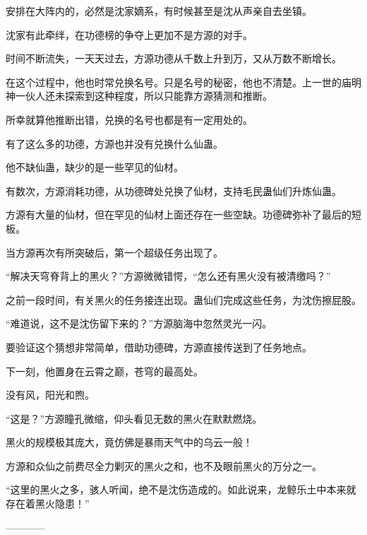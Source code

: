 \begin{this_body}
安排在大阵内的，必然是沈家嫡系，有时候甚至是沈从声亲自去坐镇。

沈家有此牵绊，在功德榜的争夺上更加不是方源的对手。

时间不断流失，一天天过去，方源功德从千数上升到万，又从万数不断增长。

在这个过程中，他也时常兑换名号。只是名号的秘密，他也不清楚。上一世的庙明神一伙人还未探索到这种程度，所以只能靠方源猜测和推断。

所幸就算他推断出错，兑换的名号也都是有一定用处的。

有了这么多的功德，方源也并没有兑换什么仙蛊。

他不缺仙蛊，缺少的是一些罕见的仙材。

有数次，方源消耗功德，从功德碑处兑换了仙材，支持毛民蛊仙们升炼仙蛊。

方源有大量的仙材，但在罕见的仙材上面还存在一些空缺。功德碑弥补了最后的短板。

当方源再次有所突破后，第一个超级任务出现了。

“解决天穹脊背上的黑火？”方源微微错愕，“怎么还有黑火没有被清缴吗？”

之前一段时间，有关黑火的任务接连出现。蛊仙们完成这些任务，为沈伤擦屁股。

“难道说，这不是沈伤留下来的？”方源脑海中忽然灵光一闪。

要验证这个猜想非常简单，借助功德碑，方源直接传送到了任务地点。

下一刻，他置身在云霄之巅，苍穹的最高处。

没有风，阳光和煦。

“这是？”方源瞳孔微缩，仰头看见无数的黑火在默默燃烧。

黑火的规模极其庞大，竟仿佛是暴雨天气中的乌云一般！

方源和众仙之前费尽全力剿灭的黑火之和，也不及眼前黑火的万分之一。

“这里的黑火之多，骇人听闻，绝不是沈伤造成的。如此说来，龙鲸乐土中本来就存在着黑火隐患！”

------------

\end{this_body}

